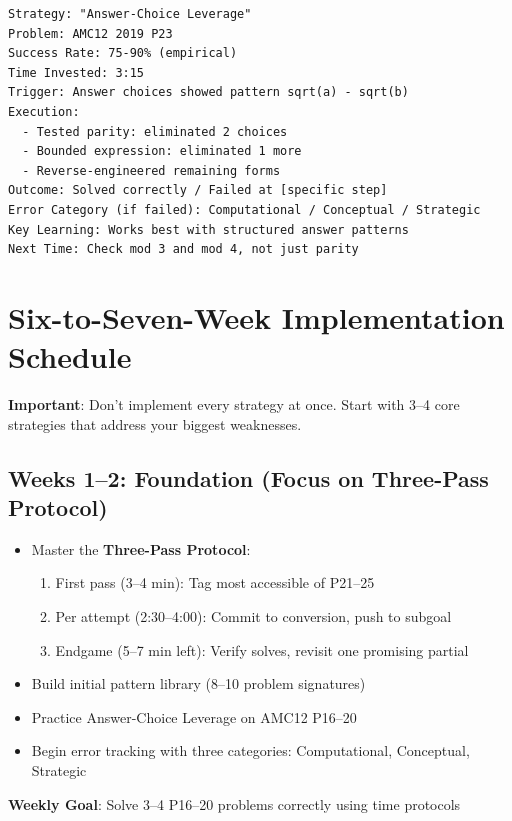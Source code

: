 \documentclass[]{article}
\begin{document}
\begin{verbatim}
Strategy: "Answer-Choice Leverage"
Problem: AMC12 2019 P23
Success Rate: 75-90% (empirical)
Time Invested: 3:15
Trigger: Answer choices showed pattern sqrt(a) - sqrt(b)
Execution: 
  - Tested parity: eliminated 2 choices
  - Bounded expression: eliminated 1 more
  - Reverse-engineered remaining forms
Outcome: Solved correctly / Failed at [specific step]
Error Category (if failed): Computational / Conceptual / Strategic
Key Learning: Works best with structured answer patterns
Next Time: Check mod 3 and mod 4, not just parity
\end{verbatim}

\section{Six-to-Seven-Week Implementation Schedule}

\textbf{Important}: Don't implement every strategy at once. Start with 3--4 core strategies that address your biggest weaknesses.

\subsection{Weeks 1--2: Foundation (Focus on Three-Pass Protocol)}
\begin{itemize}[leftmargin=*]
    \item Master the \textbf{Three-Pass Protocol}:
    \begin{enumerate}
        \item First pass (3--4 min): Tag most accessible of P21--25
        \item Per attempt (2:30--4:00): Commit to conversion, push to subgoal
        \item Endgame (5--7 min left): Verify solves, revisit one promising partial
    \end{enumerate}
    \item Build initial pattern library (8--10 problem signatures)
    \item Practice Answer-Choice Leverage on AMC12 P16--20
    \item Begin error tracking with three categories: Computational, Conceptual, Strategic
\end{itemize}
\textbf{Weekly Goal}: Solve 3--4 P16--20 problems correctly using time protocols
\end{document}
